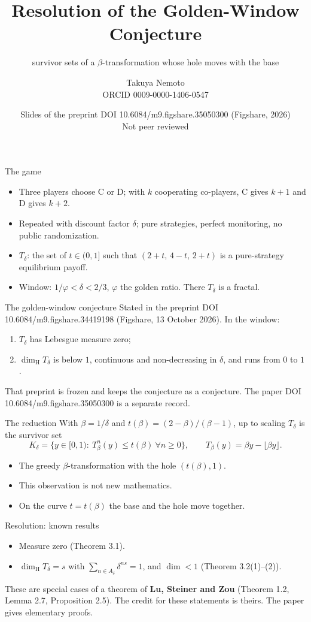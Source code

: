 \documentclass[aspectratio=169,11pt,usepdftitle=false]{beamer}
\title[Resolution of the Golden-Window Conjecture (slides)]{Resolution of the Golden-Window Conjecture}
\subtitle{survivor sets of a $\beta$-transformation whose hole moves with the base}
\author[Takuya Nemoto]{Takuya Nemoto\\[1mm]\small ORCID 0009-0000-1406-0547}
\date{\small Slides of the preprint DOI 10.6084/m9.figshare.35050300 (Figshare, 2026)\\Not peer reviewed}
\newcommand{\dimH}{\dim_{\mathrm H}}
\begin{document}
\begin{frame}
\titlepage
\end{frame}

\begin{frame}{The game}
\begin{itemize}
\item Three players choose C or D; with $k$ cooperating co-players, C gives $k+1$ and D gives $k+2$.
\item Repeated with discount factor $\delta$; pure strategies, perfect monitoring, no public randomization.
\item $T_\delta$: the set of $t\in(0,1]$ such that $(2+t,\,4-t,\,2+t)$ is a pure-strategy equilibrium payoff.
\item Window: $1/\varphi<\delta<2/3$, $\varphi$ the golden ratio. There $T_\delta$ is a fractal.
\end{itemize}
\end{frame}

\begin{frame}{The golden-window conjecture}
Stated in the preprint DOI 10.6084/m9.figshare.34419198 (Figshare, 13 October 2026). In the window:
\begin{enumerate}
\item[(a)] $T_\delta$ has Lebesgue measure zero;
\item[(b)] $\dimH T_\delta$ is below $1$, continuous and non-decreasing in $\delta$, and runs from $0$ to $1$.
\end{enumerate}
\medskip
That preprint is frozen and keeps the conjecture as a conjecture. The paper DOI 10.6084/m9.figshare.35050300 is a separate record.
\end{frame}

\begin{frame}{The reduction}
With $\beta=1/\delta$ and $t(\beta)=(2-\beta)/(\beta-1)$, up to scaling $T_\delta$ is the survivor set
\[
K_\delta=\{y\in[0,1):\ T_\beta^n(y)\le t(\beta)\ \forall n\ge0\},\qquad T_\beta(y)=\beta y-\lfloor\beta y\rfloor .
\]
\begin{itemize}
\item The greedy $\beta$-transformation with the hole $(t(\beta),1)$.
\item This observation is not new mathematics.
\item On the curve $t=t(\beta)$ the base and the hole move together.
\end{itemize}
\end{frame}

\begin{frame}{Resolution: known results}
\begin{itemize}
\item Measure zero (Theorem 3.1).
\item $\dimH T_\delta=s$ with $\sum_{n\in A_\delta}\delta^{ns}=1$, and $\dim<1$ (Theorem 3.2(1)--(2)).
\end{itemize}
These are special cases of a theorem of \textbf{Lu, Steiner and Zou} (Theorem 1.2, Lemma 2.7, Proposition 2.5).
The credit for these statements is theirs. The paper gives elementary proofs.
\end{frame}
\end{document}
